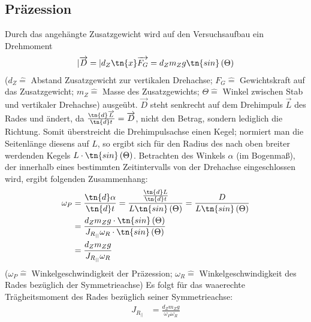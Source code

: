 \documentclass[12pt, a4paper, twoside]{scrartcl}
\begin{document}
\subsection{Präzession}
Durch das angehängte Zusatzgewicht wird auf den Versuchsaufbau ein Drehmoment\\
\begin{align*}
 |\overrightarrow{D} = | d_Z \tn{x} \overrightarrow{F_G} = d_Z  m_Z  g \tn{sin}\left( \Theta \right)
\end{align*}
($d_Z \hat{=}$ Abstand Zusatzgewicht zur vertikalen Drehachse; $F_G \hat{=}$ Gewichtskraft auf das Zusatzgewicht; $m_Z \hat{=}$ Masse des Zusatzgewichts; $\Theta \hat{=}$ Winkel zwischen Stab und vertikaler Drehachse) ausgeübt. $\overrightarrow{D}$ steht senkrecht auf dem Drehimpuls $\overrightarrow{L}$ des Rades und ändert, da $\frac{\tn{d}\overrightarrow{L}}{\tn{d} t} = \overrightarrow{D}$, nicht den Betrag, sondern lediglich die Richtung. Somit überstreicht die Drehimpulsachse einen Kegel; normiert man die Seitenlänge diesens auf $L$, so ergibt sich für den Radius des nach oben breiter werdenden Kegels $L \cdot \tn{sin} \left( \Theta \right)$. Betrachten des Winkels $\alpha$ (im Bogenmaß), der innerhalb eines bestimmten Zeitintervalls  von der Drehachse eingeschlossen wird, ergibt folgenden Zusammenhang:\\
\begin{align*}
\omega_P &= \frac{\tn{d} \alpha}{\tn{d} t} = \frac{\frac{\tn{d} L}{\tn{d} t}}{L \tn{sin} \left( \Theta \right)} = \frac{D}{L \tn{sin} \left( \Theta \right)} \\
&= \frac{d_Z m_Z g \cdot \tn{sin} \left( \Theta \right)}{ J_{R_{||}} \omega_R \cdot \tn{sin} \left( \Theta \right)}\\
&= \frac{d_Z m_Z g}{J_{R_{||}} \omega_R}
\end{align*}
($\omega_P \hat{=}$ Winkelgeschwindigkeit der Präzession; $\omega_R \hat{=}$ Winkelgeschwindigkeit des Rades bezüglich der Symmetrieachse) Es folgt für das waaerechte Trägheitsmoment des Rades bezüglich seiner Symmetrieachse:\\
\begin{align}
\label{eq:kreisel}
 J_{R_{||}} &= \frac{d_Z m_Z g}{\omega_P \omega_R}
\end{align}
\end{document}
